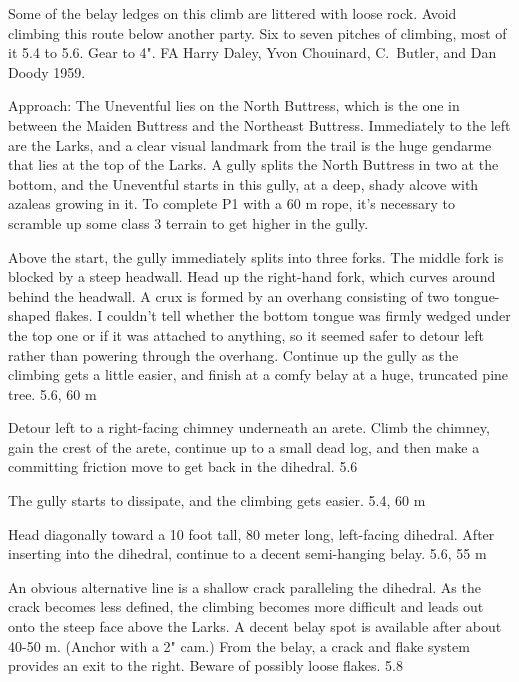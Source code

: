 \documentclass{tahquitz}
\begin{document}
\somespace

\upfriction





Some of the belay ledges on this climb
are littered with loose rock.
Avoid climbing this route below
another party.
Six to seven pitches of climbing, most of it 5.4 to 5.6. Gear to 4".
FA Harry Daley, Yvon Chouinard, C.~Butler, and Dan Doody 1959.

Approach: The Uneventful lies on the North Buttress, which is the one
in between the Maiden Buttress and the Northeast Buttress. Immediately
to the left are the Larks, and a clear visual landmark from the trail
is the huge gendarme that lies at the top of the Larks. A gully
splits the North Buttress in two at the bottom, and the Uneventful starts in this gully,
at a deep, shady alcove with azaleas
growing in it.
To complete P1 with a 60 m rope, it's necessary to scramble up some
class 3 terrain to get higher in the gully.

 Above the start, the gully immediately splits into three
forks. The middle fork is blocked by a steep headwall.
Head up the right-hand fork, which curves around behind
the headwall. A crux is formed by an overhang consisting 
of two tongue-shaped flakes.
I couldn't tell whether the bottom tongue was firmly wedged under the top
one or if it was attached to anything, so it seemed safer to detour left
rather than powering through the overhang. Continue up the gully as the
climbing gets a little easier, and finish at a comfy belay at a huge,
truncated pine tree. 5.6, 60 m

  Detour left to a right-facing chimney underneath an arete.
Climb the chimney, gain the crest of the arete, continue up
to a small dead log, and then make a committing friction
move to get back in the dihedral. 5.6

 The gully starts to dissipate, and the climbing gets easier.
5.4, 60 m

 Head diagonally toward a 10 foot tall, 80 meter long, left-facing dihedral. After
inserting into the dihedral, continue to a decent semi-hanging belay. 5.6, 55 m

 An obvious alternative line is a shallow crack paralleling the dihedral.
As the crack becomes less defined,
the climbing becomes more difficult and leads out onto the steep face above the Larks.
A decent belay spot is available after about 40-50 m. (Anchor with a 2" cam.)
From the belay, a crack and flake system provides an exit to the right. 
Beware of possibly loose flakes. 5.8
\end{document}
